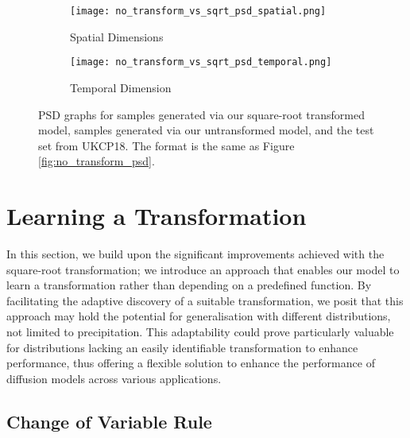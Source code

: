 \documentclass[ oneside,%
                    author={George Herbert},
                    degree={MSci},
                     title={Video Diffusion Models for Climate Simulations},
                  subtitle={}]{dissertation}
\begin{document}
\begin{figure}[htbp]
      \centering
      \begin{subfigure}{0.49\textwidth}
            \texttt{[image: no\_transform\_vs\_sqrt\_psd\_spatial.png]}
            \caption{Spatial Dimensions}
      \end{subfigure}
      \begin{subfigure}{0.49\textwidth}
            \texttt{[image: no\_transform\_vs\_sqrt\_psd\_temporal.png]}
            \caption{Temporal Dimension}
      \end{subfigure}
      \caption{PSD graphs for samples generated via our square-root transformed model, samples generated via our untransformed model, and the test set from UKCP18. The format is the same as Figure \ref{fig:no_transform_psd}.}
      \label{fig:no_transform_vs_sqrt_psd}
\end{figure}

\section{Learning a Transformation}
\label{sec:results_learning_transformation}

In this section, we build upon the significant improvements achieved with the square-root transformation; we introduce an approach that enables our model to learn a transformation rather than depending on a predefined function. By facilitating the adaptive discovery of a suitable transformation, we posit that this approach may hold the potential for generalisation with different distributions, not limited to precipitation. This adaptability could prove particularly valuable for distributions lacking an easily identifiable transformation to enhance performance, thus offering a flexible solution to enhance the performance of diffusion models across various applications.

\subsection{Change of Variable Rule}
\label{sec:results_change_of_variable}
\end{document}
